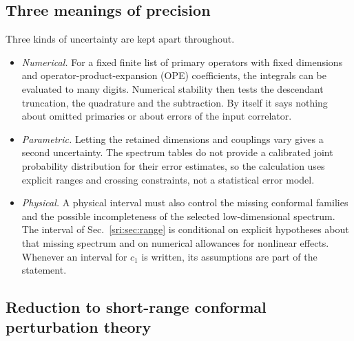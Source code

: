 \subsection{Three meanings of precision}\label{sri:app:cone:precision}
Three kinds of uncertainty are kept apart throughout.
\begin{itemize}
\item \emph{Numerical.} For a fixed finite list of primary operators with fixed dimensions and operator-product-expansion
 (OPE) coefficients, the integrals can be evaluated to many digits. Numerical stability then tests the descendant
 truncation, the quadrature and the subtraction. By itself it says nothing about omitted primaries or about errors of
 the input correlator.
\item \emph{Parametric.} Letting the retained dimensions and couplings vary gives a second uncertainty. The spectrum
 tables do not provide a calibrated joint probability distribution for their error estimates, so the calculation uses
 explicit ranges and crossing constraints, not a statistical error model.
\item \emph{Physical.} A physical interval must also control the missing conformal families and the possible
 incompleteness of the selected low-dimensional spectrum. The interval of Sec.~\ref{sri:sec:range} is conditional on
 explicit hypotheses about that missing spectrum and on numerical allowances for nonlinear effects. Whenever an
 interval for $c_1$ is written, its assumptions are part of the statement.
\end{itemize}

\subsection{Reduction to short-range conformal perturbation theory}\label{sri:app:cone:cpt}
